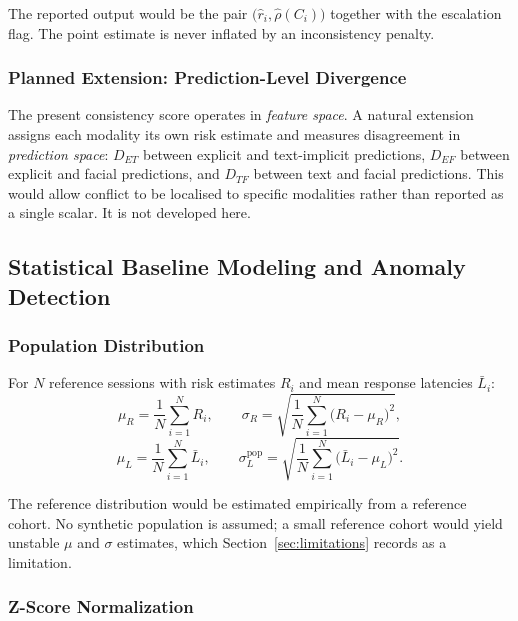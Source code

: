 \documentclass[12pt]{article}
\begin{document}
\noindent The reported output would be the pair $\bigl(\hat{r}_i,
\hat{\rho}(C_i)\bigr)$ together with the escalation flag. The point
estimate is never inflated by an inconsistency penalty.

\subsubsection{Planned Extension: Prediction-Level Divergence}
\label{sec:divergence}

The present consistency score operates in \emph{feature space}. A natural
extension assigns each modality its own risk estimate and measures
disagreement in \emph{prediction space}: $D_{ET}$ between explicit and
text-implicit predictions, $D_{EF}$ between explicit and facial
predictions, and $D_{TF}$ between text and facial predictions. This
would allow conflict to be localised to specific modalities rather than
reported as a single scalar. It is not developed here.

\subsection{Statistical Baseline Modeling and Anomaly Detection}
\label{sec:baseline}

\subsubsection{Population Distribution}

For $N$ reference sessions with risk estimates $R_i$ and mean response
latencies $\bar{L}_i$:
\begin{equation}
\mu_R = \frac{1}{N}\sum_{i=1}^{N}R_i,
\qquad
\sigma_R = \sqrt{\frac{1}{N}\sum_{i=1}^{N}\bigl(R_i - \mu_R\bigr)^{2}},
\end{equation}
\begin{equation}
\mu_L = \frac{1}{N}\sum_{i=1}^{N}\bar{L}_i,
\qquad
\sigma^{\text{pop}}_{L}
= \sqrt{\frac{1}{N}\sum_{i=1}^{N}\bigl(\bar{L}_i - \mu_L\bigr)^{2}} .
\end{equation}

\noindent The reference distribution would be estimated empirically from
a reference cohort. No synthetic population is assumed; a small
reference cohort would yield unstable $\mu$ and $\sigma$ estimates, which
Section~\ref{sec:limitations} records as a limitation.

\subsubsection{Z-Score Normalization}
\end{document}
